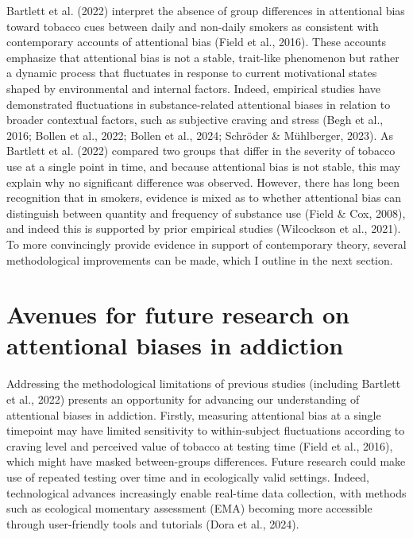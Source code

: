 \documentclass[authordate, empirical]{jote-new-article}
\begin{document}
	Bartlett et al. (2022) interpret the absence of group differences in attentional bias toward tobacco cues between daily and non-daily smokers as consistent with contemporary accounts of attentional bias (Field et al., 2016). These accounts emphasize that attentional bias is not a stable, trait-like phenomenon but rather a dynamic process that fluctuates in response to current motivational states shaped by environmental and internal factors. Indeed, empirical studies have demonstrated fluctuations in substance-related attentional biases in relation to broader contextual factors, such as subjective craving and stress (Begh et al., 2016; Bollen et al., 2022; Bollen et al., 2024; Schröder \& Mühlberger, 2023). As Bartlett et al. (2022) compared two groups that differ in the severity of tobacco use at a single point in time, and because attentional bias is not stable, this may explain why no significant difference was observed. However, there has long been recognition that in smokers, evidence is mixed as to whether attentional bias can distinguish between quantity and frequency of substance use (Field \& Cox, 2008), and indeed this is supported by prior empirical studies (Wilcockson et al., 2021). To more convincingly provide evidence in support of contemporary theory, several methodological improvements can be made, which I outline in the next section.



	\section{Avenues for future research on attentional biases in addiction}



	Addressing the methodological limitations of previous studies (including Bartlett et al., 2022) presents an opportunity for advancing our understanding of attentional biases in addiction. Firstly, measuring attentional bias at a single timepoint may have limited sensitivity to within-subject fluctuations according to craving level and perceived value of tobacco at testing time (Field et al., 2016), which might have masked between-groups differences. Future research could make use of repeated testing over time and in ecologically valid settings. Indeed, technological advances increasingly enable real-time data collection, with methods such as ecological momentary assessment (EMA) becoming more accessible through user-friendly tools and tutorials (Dora et al., 2024).
\end{document}
